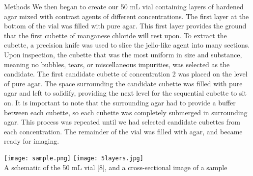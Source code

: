 \documentclass[a4paper,12pt]{article}
\begin{document}
\begin{section}{Methods}
We then began to create our 50 mL vial containing layers of hardened agar mixed with contrast agents of different concentrations. The first layer at the bottom of the vial was filled with pure agar. This first layer provides the ground that the first cubette of manganese chloride will rest upon. To extract the cubette, a precision knife was used to slice the jello-like agent into many sections. Upon inspection, the cubette that was the most uniform in size and substance, meaning no bubbles, tears, or miscellaneous impurities, was selected as the candidate. The first candidate cubette of concentration 2 was placed on the level of pure agar. The space surrounding the candidate cubette was filled with pure agar and left to solidify, providing the next level for the sequential cubette to sit on. It is important to note that the surrounding agar had to provide a buffer between each cubette, so each cubette was completely submerged in surrounding agar. This process was repeated until we had selected candidate cubettes from each concentration. The remainder of the vial was filled with agar, and became ready for imaging. \\

\begin{center}
\texttt{[image: sample.png]}
\hspace{25mm}
\texttt{[image: 5layers.jpg]} \\
\small{A schematic of the 50 mL vial [8], and a cross-sectional image of a sample}
\end{center}

\end{section}
\end{document}

